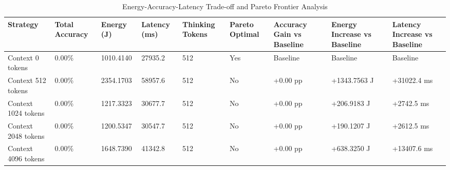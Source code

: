\begin{table}
\caption{Energy-Accuracy-Latency Trade-off and Pareto Frontier Analysis}
\label{tab:tradeoff_comparison}
\begin{tabular}{lllllllll}
\toprule
Strategy & Total Accuracy & Energy (J) & Latency (ms) & Thinking Tokens & Pareto Optimal & Accuracy Gain vs Baseline & Energy Increase vs Baseline & Latency Increase vs Baseline \\
\midrule
Context 0 tokens & 0.00\% & 1010.4140 & 27935.2 & 512 & Yes & Baseline & Baseline & Baseline \\
Context 512 tokens & 0.00\% & 2354.1703 & 58957.6 & 512 & No & +0.00 pp & +1343.7563 J & +31022.4 ms \\
Context 1024 tokens & 0.00\% & 1217.3323 & 30677.7 & 512 & No & +0.00 pp & +206.9183 J & +2742.5 ms \\
Context 2048 tokens & 0.00\% & 1200.5347 & 30547.7 & 512 & No & +0.00 pp & +190.1207 J & +2612.5 ms \\
Context 4096 tokens & 0.00\% & 1648.7390 & 41342.8 & 512 & No & +0.00 pp & +638.3250 J & +13407.6 ms \\
\bottomrule
\end{tabular}
\end{table}
